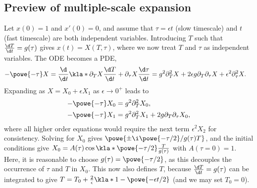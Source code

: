 \documentclass[english, parskip=full]{scrartcl}
\begin{document}
\subsection{Preview of multiple-scale expansion}
Let $x(0)=1$ and $x'(0)=0$, and assume that $\tau=\epsilon t$ (slow timescale) and $t$ (fast timescale) are both independent variables.
Introducing $T$ such that $\frac{\d T}{\d t} = g(\tau)$ gives $x(t)=X(T,\tau)$, where we now treat $T$ and $\tau$ as independent variables.
The ODE becomes a PDE,
\begin{align}
-\powe{-\tau} X &= \frac{\d}{\d t} \kla*{\partial_TX \frac{\d T}{\d t} + \partial_\tau X \frac{\d \tau}{\d t}} = g^2 \partial_T^2X + 2\epsilon g \partial_T\partial_\tau X + \epsilon^2 \partial_\tau^2 X.
\end{align}
Expanding as $X=X_0+\epsilon X_1$ as $\epsilon\rightarrow 0^+$ leads to
\begin{align}
-\powe{-\tau} X_0 &= g^2\partial_T^2 X_0,\\
-\powe{-\tau} X_1 &= g^2\partial_T^2 X_1 + 2g\partial_T \partial_\tau X_0,
\end{align}
where all higher order equations would require the next term $\epsilon^2X_2$ for consistency.
Solving for $X_0$ gives $\powe{\pm\i \powe{-\tau/2} / g(\tau) T}$, and the initial conditions give $X_0 = A(\tau) \cos\kla*{\powe{-\tau/2} \frac{T}{g(\tau)}}$ with $A(\tau=0)=1$.
Here, it is reasonable to choose $g(\tau)=\powe{-\tau/2}$, as this decouples the occurrence of $\tau$ and $T$ in $X_0$.
This now also defines $T$, because $\frac{\d T}{\d t} = g(\tau)$ can be integrated to give $T = T_0 + \frac{2}{\epsilon} \kla*{1 - \powe{-\epsilon t/2}}$ (and we may set $T_0=0$).
\end{document}
